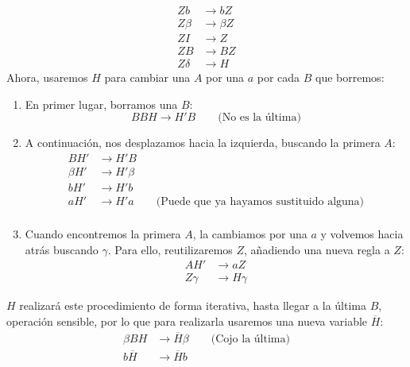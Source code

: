 \begin{ejercicio}
\begin{enumerate}
\begin{align*}
                Zb &\rightarrow bZ \\
                Z\beta &\rightarrow \beta Z \\
                ZI &\rightarrow Z \\
                ZB &\rightarrow BZ \\
                Z\delta &\rightarrow H
            \end{align*}
            Ahora, usaremos $H$ para cambiar una $A$ por una $a$ por cada $B$ que borremos:
            \begin{enumerate}
                \item En primer lugar, borramos una $B$:
                    \begin{equation*}
                        BBH \rightarrow H'B \qquad \text{(No es la última)}
                    \end{equation*}
                \item A continuación, nos desplazamos hacia la izquierda, buscando la primera $A$:
                    \begin{align*}
                        BH' &\rightarrow H'B \\
                        \beta H' &\rightarrow H'\beta \\
                        bH' &\rightarrow H'b \\
                        aH' &\rightarrow H'a \qquad \text{(Puede que ya hayamos sustituido alguna)} \\
                    \end{align*}
                \item Cuando encontremos la primera $A$, la cambiamos por una $a$ y volvemos hacia atrás buscando $\gamma$. Para ello, reutilizaremos $Z$, añadiendo una nueva regla a $Z$:
                    \begin{align*}
                        AH' &\rightarrow aZ \\
                        Z\gamma &\rightarrow H\gamma
                    \end{align*}
            \end{enumerate}
            $H$ realizará este procedimiento de forma iterativa, hasta llegar a la última $B$, operación sensible, por lo que para realizarla usaremos una nueva variable $\overline{H}$:
            \begin{align*}
                \beta BH &\rightarrow \overline{H}\beta \qquad \text{(Cojo la última)} \\
                b\overline{H} &\rightarrow \overline{H}b \\

\end{align*}
\end{enumerate}
\end{ejercicio}
